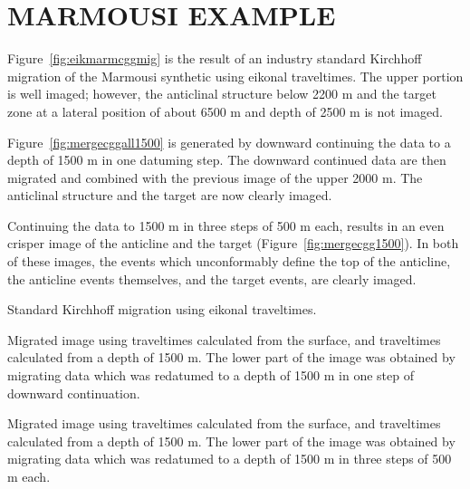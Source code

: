 


\section{MARMOUSI EXAMPLE}

Figure~\ref{fig:eikmarmcggmig} is the result of
an industry standard Kirchhoff migration
of the Marmousi synthetic using eikonal traveltimes. The upper
portion is well imaged; however, the anticlinal structure below 2200 m and
the target zone at a lateral position of about 6500 m 
and depth of 2500 m is not imaged.

Figure~\ref{fig:mergecggall1500} is generated by downward continuing the data
to a depth of 1500 m in one datuming step. The downward
continued data are then migrated and combined with the previous image of
the upper 2000 m. The anticlinal structure and the target are now clearly
imaged.

Continuing the data to 1500 m in three steps of 500 m each, results
in an even crisper
image of the anticline and the target (Figure~\ref{fig:mergecgg1500}).
In both of these images,
the events which unconformably define the top of the anticline,
the anticline events themselves, and the target events, are clearly
imaged.

{Standard Kirchhoff migration using eikonal traveltimes.}

{Migrated image using traveltimes calculated from the surface, and
traveltimes calculated from a depth of 1500 m.
The lower part of the image was obtained by migrating data which
was redatumed to a depth of 1500 m in one step
of downward continuation.}

{Migrated image using traveltimes calculated from the surface, and 
traveltimes calculated from a depth of 1500 m.
The lower part of the image was obtained by migrating data which
was redatumed to a depth of 1500 m in three steps of 500 m each.}

